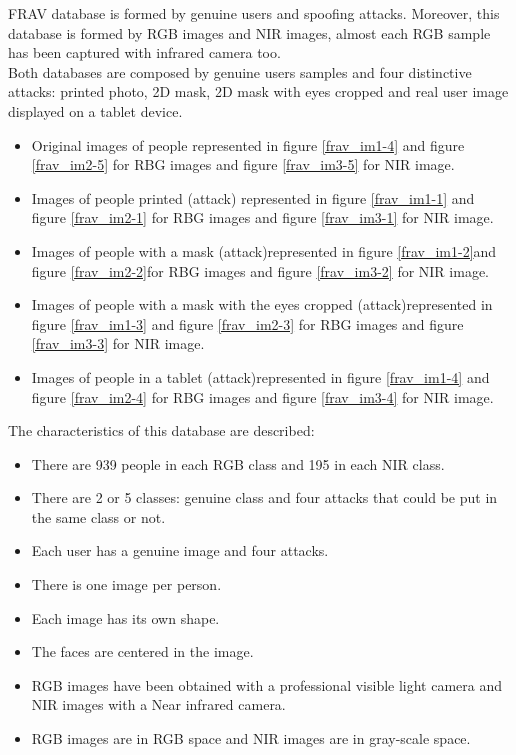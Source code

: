 FRAV database is formed by genuine users and spoofing attacks. Moreover, this database is formed by RGB images and NIR images, almost each RGB sample has been captured with infrared camera too.\\

Both databases are composed by genuine users samples and four distinctive attacks: printed photo, 2D mask, 2D mask with eyes cropped and real user image displayed on a tablet device.
\begin{itemize}[itemsep=2pt,topsep=8pt,parsep=0pt,partopsep=20pt]
 \item Original images of people represented in figure \ref{frav_im1-4} and figure \ref{frav_im2-5} for RBG images and figure \ref{frav_im3-5} for NIR image.
 \item Images of people printed (attack) represented in figure \ref{frav_im1-1} and figure \ref{frav_im2-1} for RBG images and figure \ref{frav_im3-1} for NIR image.
 \item Images of people with a mask (attack)represented in figure \ref{frav_im1-2}and figure \ref{frav_im2-2}for RBG images and figure \ref{frav_im3-2} for NIR image.
 \item Images of people with a mask with the eyes cropped (attack)represented in figure \ref{frav_im1-3} and figure \ref{frav_im2-3} for RBG images and figure \ref{frav_im3-3} for NIR image.
 \item Images of people in a tablet (attack)represented in figure \ref{frav_im1-4} and figure \ref{frav_im2-4} for RBG images and figure \ref{frav_im3-4} for NIR image.
 \end{itemize}

The characteristics of this database are described:
\begin{itemize}[itemsep=2pt,topsep=8pt,parsep=0pt,partopsep=20pt]
\item There are 939 people in each RGB class and 195 in each NIR class.
\item There are 2 or 5 classes: genuine class and four attacks that could be put in the same class or not.
\item Each user has a genuine image and four attacks.
\item There is one image per person.
\item Each image has its own shape.
\item The faces are centered in the image.
\item RGB images have been obtained with a professional visible light camera and NIR images with a Near infrared camera.
\item RGB images are in RGB space and NIR images are in gray-scale space.
\end{itemize}

